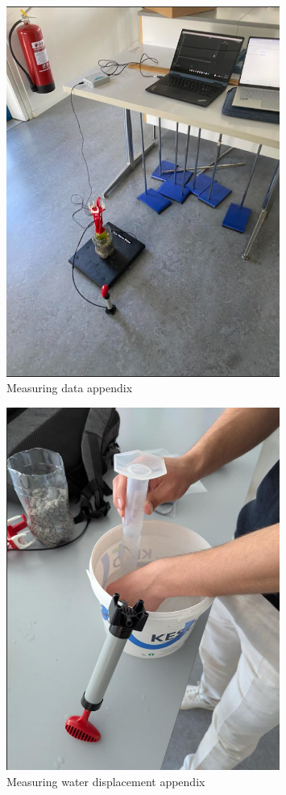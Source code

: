 \documentclass[12pt,a4paper]{article}
\begin{document}
\begin{figure}[H]
\centering
\includegraphics[width=0.8\textwidth]{measuring data appendix.png}
\caption{Measuring data appendix}
\label{fig:data_appendix}
\end{figure}

\begin{figure}[H]
\centering
\includegraphics[width=0.8\textwidth]{measuring water sicplacment appendix.png}
\caption{Measuring water displacement appendix}
\label{fig:water_displacement_appendix}
\end{figure}
\end{document}
